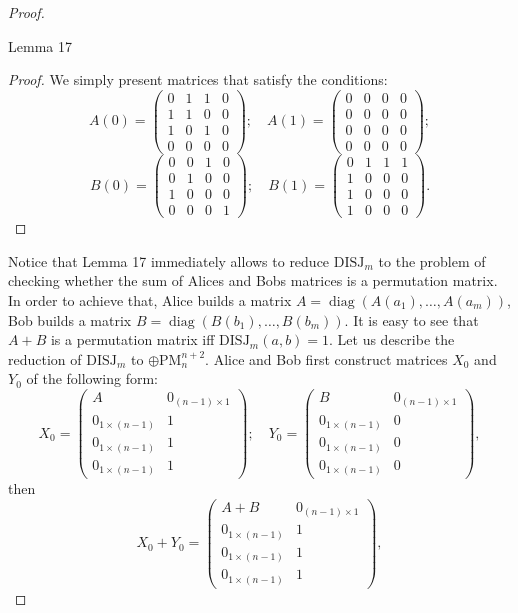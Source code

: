 \begin{proof}
\begin{authorclaim}{Lemma 17}
\end{authorclaim}
\begin{proof}
We simply present matrices that satisfy the conditions:
\[
A(0)=\begin{pmatrix}0&1&1&0\\1&1&0&0\\1&0&1&0\\0&0&0&0\end{pmatrix};
\quad A(1)=\begin{pmatrix}0&0&0&0\\0&0&0&0\\0&0&0&0\\0&0&0&0\end{pmatrix};
\]
\[
B(0)=\begin{pmatrix}0&0&1&0\\0&1&0&0\\1&0&0&0\\0&0&0&1\end{pmatrix};
\quad B(1)=\begin{pmatrix}0&1&1&1\\1&0&0&0\\1&0&0&0\\1&0&0&0\end{pmatrix}.
\]
\end{proof}
Notice that Lemma 17 immediately allows to reduce $\mathrm{DISJ}_m$ to the problem of checking whether the sum of Alices and Bobs matrices is a permutation matrix. In order to achieve that, Alice builds a matrix $A=\operatorname{diag}(A(a_1),\ldots,A(a_m))$, Bob builds a matrix $B=\operatorname{diag}(B(b_1),\ldots,B(b_m))$. It is easy to see that $A+B$ is a permutation matrix iff $\mathrm{DISJ}_m(a,b)=1$.
Let us describe the reduction of $\mathrm{DISJ}_m$ to $\oplus\mathrm{PM}_n^{n+2}$. Alice and Bob first construct matrices $X_0$ and $Y_0$ of the following form:
\[
X_0=\begin{pmatrix}A&0_{(n-1)\times1}\\0_{1\times(n-1)}&1\\0_{1\times(n-1)}&1\\0_{1\times(n-1)}&1\end{pmatrix};
\quad Y_0=\begin{pmatrix}B&0_{(n-1)\times1}\\0_{1\times(n-1)}&0\\0_{1\times(n-1)}&0\\0_{1\times(n-1)}&0\end{pmatrix},
\]
then
\[
X_0+Y_0=\begin{pmatrix}A+B&0_{(n-1)\times1}\\0_{1\times(n-1)}&1\\0_{1\times(n-1)}&1\\0_{1\times(n-1)}&1\end{pmatrix},
\]
\end{proof}
